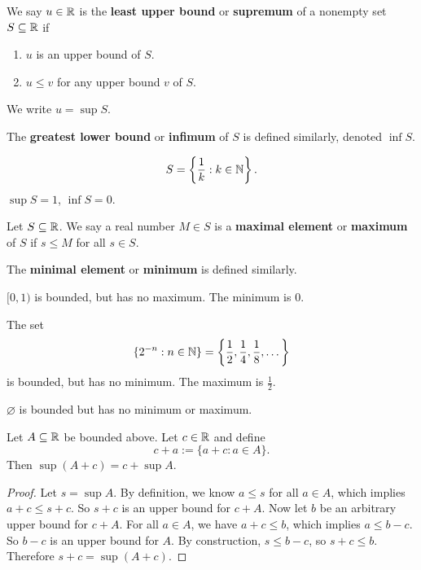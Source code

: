 \begin{definition}
  We say $u \in \mathbb{R}$ is the \textbf{least upper bound}
  or \textbf{supremum} of a nonempty set $S \subseteq \mathbb{R}$
  if
  \begin{enumerate}
    \item $u$ is an upper bound of $S$.
    \item $u \le v$ for any upper bound $v$ of $S$.
  \end{enumerate}
  We write $u = \sup S$.
\end{definition}

The \textbf{greatest lower bound} or \textbf{infimum}
of $S$ is defined similarly, denoted $\inf S$.

\begin{example}
  \[S = \left\{\frac{1}{k} : k \in \mathbb{N}\right\}.\]
  $\sup S = 1$,  $\inf S = 0$.
\end{example}

\begin{definition}
  Let $S \subseteq \mathbb{R}$. We say a real number
  $M \in S$ is a \textbf{maximal element} or
  \textbf{maximum} of $S$ if $s \le M$ for all
  $s \in S$.
\end{definition}

The \textbf{minimal element} or \textbf{minimum}
is defined similarly.

\begin{example}
  $[0, 1)$ is bounded, but has no maximum. The minimum is
  $0$.
\end{example}

\begin{example}
  The set
  \[\{2^{-n} : n \in \mathbb{N}\} = \left\{\frac{1}{2}, \frac{1}{4}, \frac{1}{8}, \dots\right\}\]
  is bounded, but has no minimum. The maximum is
  $\frac{1}{2}$.
\end{example}

\begin{example}
  $\varnothing$ is bounded but has no minimum or maximum.
\end{example}

\begin{exercise}
  Let $A \subseteq \mathbb{R}$ be bounded above. Let  $c \in \mathbb{R}$
  and define
  \[c + a := \{a + c : a \in A\}.\]
  Then  $\sup (A + c) = c + \sup A$.
\end{exercise}

\begin{proof}
  Let $s = \sup A$. By definition, we know  $a \le s$
  for all  $a \in A$, which implies
  $a + c \le s + c$. So $s + c$ is an upper bound
  for $c + A$.
  Now let  $b$ be an arbitrary upper bound
  for $c + A$.  For all $a \in A$, we have
  $a + c \le b$, which implies $a \le b - c$. So
  $b - c$ is an upper bound for  $A$. By construction,
  $s \le b - c$, so $s + c \le b$. Therefore
  $s + c = \sup (A + c)$.
\end{proof}

